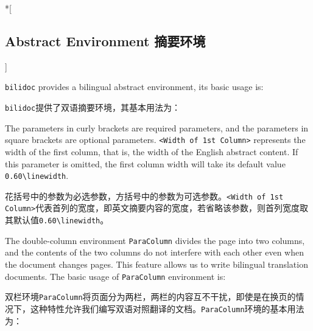 \begin{ParaColumn}

    \switchcolumn[0]*[\subsection{Abstract Environment 摘要环境}]

    \verb"bilidoc" provides a bilingual abstract environment, its basic usage is:

    \switchcolumn

    \verb"bilidoc"提供了双语摘要环境，其基本用法为：

    \CrossColumnText{
        
    }
    \switchcolumn*

    The parameters in curly brackets are required parameters, and the parameters in square brackets  are optional parameters.  \verb"<Width of 1st Column>" represents the width of the first column, that is, the width of the English abstract content. If this parameter is omitted, the first column width will take its default value \verb"0.60\linewidth".

    \switchcolumn

    花括号中的参数为必选参数，方括号中的参数为可选参数。\verb"<Width of 1st Column>"代表首列的宽度，即英文摘要内容的宽度，若省略该参数，则首列宽度取其默认值\verb"0.60\linewidth"。


    The double-column environment \verb"ParaColumn" divides the page into two columns, and the contents of the two columns do not interfere with each other even when the document changes pages. This feature allows us to write bilingual translation documents.  The basic usage of \verb"ParaColumn" environment is:

    \switchcolumn

    双栏环境\verb"ParaColumn"将页面分为两栏，两栏的内容互不干扰，即使是在换页的情况下，这种特性允许我们编写双语对照翻译的文档。\verb"ParaColumn"环境的基本用法为：

    \CrossColumnText{
        
    }
    \switchcolumn*
    

\end{ParaColumn}
